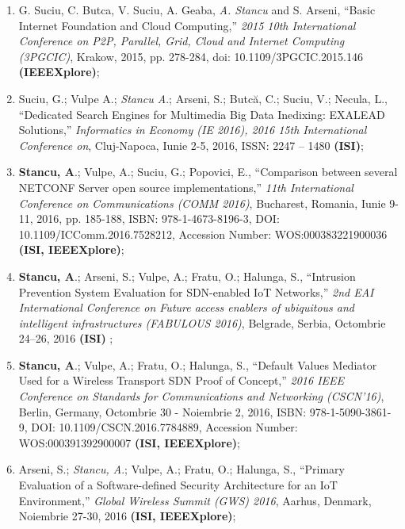\begin{enumerate}
	\item G. Suciu, C. Butca, V. Suciu, A. Geaba, \textit{A. Stancu} and S. Arseni, ``Basic Internet Foundation and Cloud Computing,'' \textit{2015 10th International Conference on P2P, Parallel, Grid, Cloud and Internet Computing (3PGCIC)}, Krakow, 2015, pp. 278-284, doi: 10.1109/3PGCIC.2015.146 \textbf{(IEEEXplore)};
	
	\item Suciu, G.; Vulpe A.; \textit{Stancu A}.; Arseni, S.; Butcă, C.; Suciu, V.; Necula, L., ``Dedicated Search Engines for Multimedia Big Data Inedixing: EXALEAD Solutions,'' \textit{Informatics in Economy (IE 2016), 2016 15th International Conference on}, Cluj-Napoca, Iunie 2-5, 2016, ISSN: 2247 – 1480 \textbf{(ISI)};
	
	\item \textbf{Stancu, A}.; Vulpe, A.; Suciu, G.; Popovici, E., ``Comparison between several NETCONF Server open source implementations,'' \textit{11th International Conference on Communications (COMM 2016)}, Bucharest, Romania, Iunie 9-11, 2016, pp. 185-188, ISBN: 978-1-4673-8196-3, DOI: 10.1109/ICComm.2016.7528212, Accession Number: WOS:000383221900036 \textbf{(ISI, IEEEXplore)}\label{item:comparison_netconf};
	
	\item \textbf{Stancu, A}.; Arseni, S.; Vulpe, A.; Fratu, O.; Halunga, S., ``Intrusion Prevention System Evaluation for SDN-enabled IoT Networks,'' \textit{2nd EAI International Conference on Future access enablers of ubiquitous and intelligent infrastructures (FABULOUS 2016)}, Belgrade, Serbia, Octombrie 24–26, 2016 \textbf{(ISI)} \label{item:ips_iot};
	
	\item \textbf{Stancu, A}.; Vulpe, A.; Fratu, O.; Halunga, S., ``Default Values Mediator Used for a Wireless Transport SDN Proof of Concept,'' \textit{2016 IEEE Conference on Standards for Communications and Networking (CSCN'16)}, Berlin, Germany, Octombrie 30 - Noiembrie 2, 2016, ISBN: 978-1-5090-3861-9, DOI: 10.1109/CSCN.2016.7784889, Accession Number: WOS:000391392900007 \textbf{(ISI, IEEEXplore)}\label{item:dvm_v01};
	
	\item Arseni, S.; \textit{Stancu, A}.; Vulpe, A.; Fratu, O.; Halunga, S., ``Primary Evaluation of a Software-defined Security Architecture for an IoT Environment,'' \textit{Global Wireless Summit (GWS) 2016}, Aarhus, Denmark, Noiembrie 27-30, 2016 \textbf{ (ISI, IEEEXplore)};
	

\end{enumerate}
